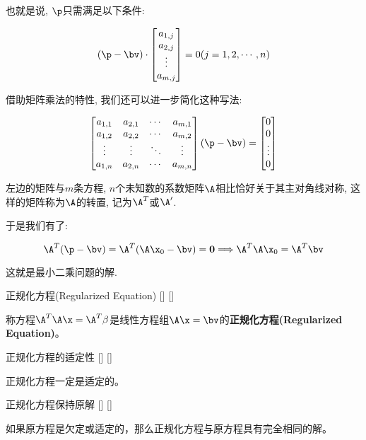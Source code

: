 \documentclass[UTF8]{ctexart}
\begin{document}
\begin{prf}
				也就是说, $\p$只需满足以下条件: 
				
				$$(\p-\bv)\cdot\begin{bmatrix}
				a_{1,j}\\
				a_{2,j}\\
				\vdots\\
				a_{m,j}\\
				\end{bmatrix}=0(j=1,2,\cdots,n)$$
				
				借助矩阵乘法的特性, 我们还可以进一步简化这种写法: 
				
				$$\begin{bmatrix}
				a_{1,1} & a_{2,1} & \cdots & a_{m,1}\\
				a_{1,2} & a_{2,2} & \cdots & a_{m,2}\\
				\vdots & \vdots & \ddots & \vdots\\
				a_{1,n} & a_{2,n} & \cdots & a_{m,n}\\
				\end{bmatrix}(\p-\bv)=
				\begin{bmatrix}
				0\\
				0\\
				\vdots\\
				0\\
				\end{bmatrix}$$
				
				左边的矩阵与$m$条方程, $n$个未知数的系数矩阵$\A$相比恰好关于其主对角线对称, 这样的矩阵称为$\A$的转置, 记为$\A^T$或$\A'$. 
				
				于是我们有了: 
				
				$$\A^T(\p-\bv)=\A^T(\A\x_0-\bv)=\mathbf{0}\Longrightarrow \A^T\A\x_0=\A^T\bv$$
				
				这就是最小二乘问题的解.
		\end{prf} 

		\begin{dfn}
			[]
			{正规化方程(Regularized Equation)}
			[]
			[]

			称方程$\A^T\A \x=\A^T\beta$是线性方程组$\A\x=\bv$的\textbf{正规化方程(Regularized Equation)}。
		\end{dfn}

		\begin{ppt}
			[]
			{正规化方程的适定性}
			[]
			[]

			正规化方程一定是适定的。
		\end{ppt}

		\begin{ppt}
			[]
			{正规化方程保持原解}
			[]
			[]

			如果原方程是欠定或适定的，那么正规化方程与原方程具有完全相同的解。
		\end{ppt}
\end{document}
